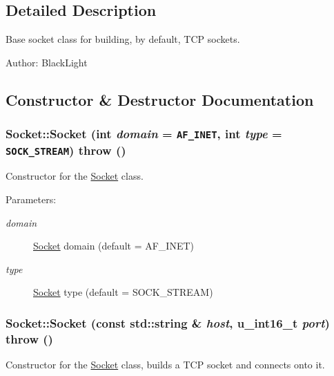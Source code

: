 \subsection{Detailed Description}
Base socket class for building, by default, TCP sockets. 

\begin{Desc}
\item[Author:]BlackLight \end{Desc}


\subsection{Constructor \& Destructor Documentation}
\hypertarget{classSocket_08ec85e71ecfde6ee952624696b3e1cb}{
\subsubsection[{Socket}]{\setlength{\rightskip}{0pt plus 5cm}Socket::Socket (int {\em domain} = {\tt AF\_\-INET}, \/  int {\em type} = {\tt SOCK\_\-STREAM})  throw ()}}
\label{classSocket_08ec85e71ecfde6ee952624696b3e1cb}


Constructor for the \hyperlink{classSocket}{Socket} class. 

\begin{Desc}
\item[Parameters:]
\begin{description}
\item[{\em domain}]\hyperlink{classSocket}{Socket} domain (default = AF\_\-INET) \item[{\em type}]\hyperlink{classSocket}{Socket} type (default = SOCK\_\-STREAM) \end{description}
\end{Desc}
\hypertarget{classSocket_07d73b007fcdfa7cc4b8b90820b563de}{
\subsubsection[{Socket}]{\setlength{\rightskip}{0pt plus 5cm}Socket::Socket (const std::string \& {\em host}, \/  u\_\-int16\_\-t {\em port})  throw ()}}
\label{classSocket_07d73b007fcdfa7cc4b8b90820b563de}


Constructor for the \hyperlink{classSocket}{Socket} class, builds a TCP socket and connects onto it. 

